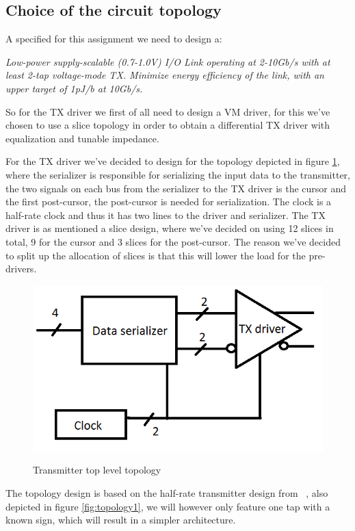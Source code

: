 \subsection{Choice of the circuit topology}

A specified for this assignment we need to design a:

\textit{Low-power supply-scalable (0.7-1.0V) I/O Link operating at 2-10Gb/s with at
least 2-tap voltage-mode TX. Minimize energy efficiency of the link, with an upper target
of 1pJ/b at 10Gb/s. }

So for the TX driver we first of all need to design a VM driver, for this we've chosen to use a slice topology in order to obtain a differential TX driver with equalization and tunable impedance.

For the TX driver we've decided to design for the topology depicted in figure \ref{fig:topology_tx}, where the serializer is responsible for serializing the input data to the transmitter, the two signals on each bus from the serializer to the TX driver is the cursor and the first post-cursor, the post-cursor is needed for serialization. The clock is a half-rate clock and thus it has two lines to the driver and serializer. The TX driver is as mentioned a slice design, where we've decided on using 12 slices in total, 9 for the cursor and 3 slices for the post-cursor. The reason we've decided to split up the allocation of slices is that this will lower the load for the pre-drivers.

\begin{figure}[H]
  \centering
  {\includegraphics[scale=0.55]{img/topology_tx.png}}
  \caption{Transmitter top level topology}
  \label{fig:topology_tx}
\end{figure}

The topology design is based on the half-rate transmitter design from ~\cite{menolfi2007a}, also depicted in figure \ref{fig:topology1}, we will however only feature one tap with a known sign, which will result in a simpler architecture.

